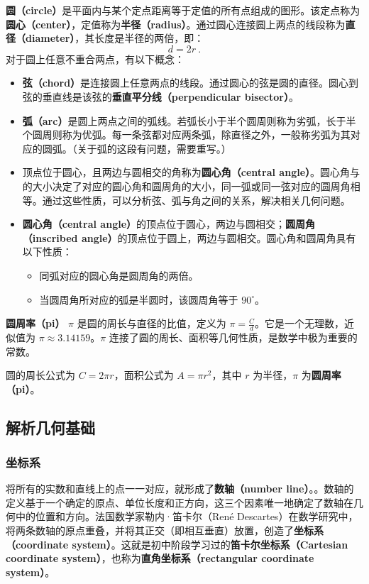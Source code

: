 \textbf{圆（circle）}是平面内与某个定点距离等于定值的所有点组成的图形。该定点称为\textbf{圆心（center）}，定值称为\textbf{半径（radius）}。通过圆心连接圆上两点的线段称为\textbf{直径（diameter）}，其长度是半径的两倍，即：
\begin{equation}
d = 2r~.
\end{equation}
对于圆上任意不重合两点，有以下概念：
\begin{itemize}
\item \textbf{弦（chord）}是连接圆上任意两点的线段。通过圆心的弦是圆的直径。圆心到弦的垂直线是该弦的\textbf{垂直平分线（perpendicular bisector）}。
\item \textbf{弧（arc）}是圆上两点之间的弧线。若弧长小于半个圆周则称为劣弧，长于半个圆周则称为优弧。每一条弦都对应两条弧，除直径之外，一般称劣弧为其对应的圆弧。（关于弧的这段有问题，需要重写。）
\item 顶点位于圆心，且两边与圆相交的角称为\textbf{圆心角（central angle）}。圆心角与
的大小决定了对应的圆心角和圆周角的大小，同一弧或同一弦对应的圆周角相等。通过这些性质，可以分析弦、弧与角之间的关系，解决相关几何问题。


\item \textbf{圆心角（central angle）}的顶点位于圆心，两边与圆相交；\textbf{圆周角（inscribed angle）}的顶点位于圆上，两边与圆相交。圆心角和圆周角具有以下性质：
    \begin{itemize}
        \item 同弧对应的圆心角是圆周角的两倍。
        \item 当圆周角所对应的弧是半圆时，该圆周角等于 $90^\circ$。
    \end{itemize}
\end{itemize}

\textbf{圆周率（pi）} $\pi$ 是圆的周长与直径的比值，定义为 $\pi = \frac{C}{d}$。它是一个无理数，近似值为 $\pi \approx 3.14159$。$\pi$ 连接了圆的周长、面积等几何性质，是数学中极为重要的常数。

圆的周长公式为 $C = 2\pi r$，面积公式为 $A = \pi r^2$，其中 $r$ 为半径，$\pi$ 为\textbf{圆周率（pi）}。

\subsection{解析几何基础}

\subsubsection{坐标系}
将所有的实数和直线上的点一一对应，就形成了\textbf{数轴（number line）}。。数轴的定义基于一个确定的原点、单位长度和正方向，这三个因素唯一地确定了数轴在几何中的位置和方向。法国数学家勒内·笛卡尔（René Descartes）在数学研究中，将两条数轴的原点重叠，并将其正交（即相互垂直）放置，创造了\textbf{坐标系（coordinate system）}。这就是初中阶段学习过的\textbf{笛卡尔坐标系（Cartesian coordinate system）}，也称为\textbf{直角坐标系（rectangular coordinate system）}。

